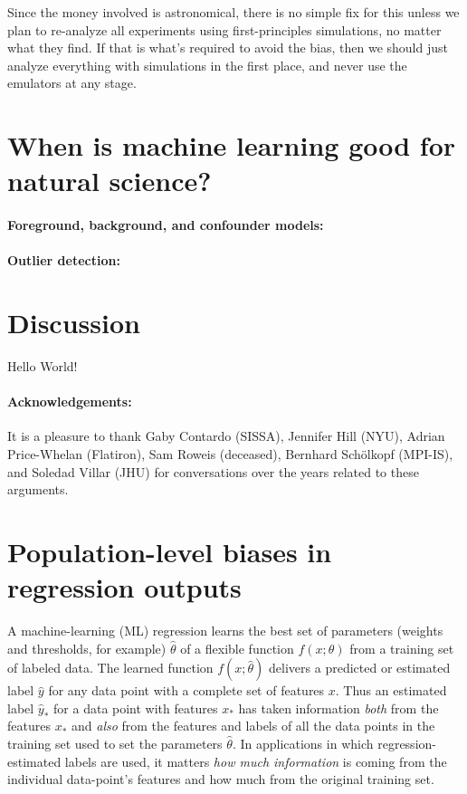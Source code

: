 \documentclass[11pt]{article}
\begin{document}
Since the money involved is astronomical, there is no simple fix for this unless we plan to re-analyze all experiments using first-principles simulations, no matter what they find.
If that is what's required to avoid the bias, then we should just analyze everything with simulations in the first place, and never use the emulators at any stage.

\section{When is machine learning good for natural science?}\label{sec:good}

\paragraph{Foreground, background, and confounder models:}

\paragraph{Outlier detection:}

\section{Discussion}\label{sec:discussion}

Hello World!

\paragraph{Acknowledgements:}
It is a pleasure to thank
  Gaby Contardo (SISSA),
  Jennifer Hill (NYU),
  Adrian Price-Whelan (Flatiron),
  Sam Roweis (deceased),
  Bernhard Sch\"olkopf (MPI-IS), and
  Soledad Villar (JHU)
for conversations over the years related to these arguments.

{\raggedright


}

\clearpage\appendix
\section{Population-level biases in regression outputs}
A machine-learning (ML) regression learns the best set of parameters (weights and thresholds, for example) $\hat{\theta}$ of a flexible function $f(x;\theta)$ from a training set of labeled data.
The learned function $f(x;\hat{\theta})$ delivers a predicted or estimated label $\hat{y}$ for any data point with a complete set of features $x$.
Thus an estimated label $\hat{y}_\ast$ for a data point with features $x_\ast$ has taken information \emph{both} from the features $x_\ast$ and \emph{also} from the features and labels of all the data points in the training set used to set the parameters $\hat{\theta}$.
In applications in which regression-estimated labels are used, it matters \emph{how much information} is coming from the individual data-point's features and how much from the original training set.
\end{document}
